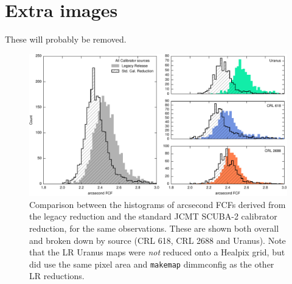 \documentclass[twocolumn]{aastex6}
\begin{document}



\section{Extra images}
These will probably be removed.
\begin{figure}
\includegraphics{legacyFCF-caldbFCF-histograms.pdf}
\caption{Comparison between the histograms of
  arcsecond FCFs derived from the legacy reduction and the standard
  JCMT SCUBA-2 calibrator reduction, for the same observations.
  These are shown both overall and broken down by source (CRL 618,
  CRL 2688 and Uranus). Note that the LR Uranus maps were \emph{not}
  reduced onto a Healpix grid, but did use the same pixel area and
  \texttt{makemap} dimmconfig as the other LR reductions.\label{fig:lr-caldb-histo}}
\end{figure}
\end{document}

